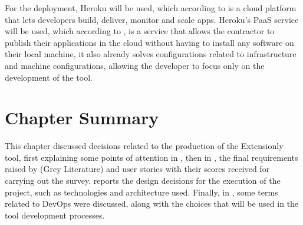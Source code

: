 For the deployment, Heroku will be used, which according to \textcite{heroku} is a cloud platform that lets developers build, deliver, monitor and scale apps. Heroku's \ac{PaaS} service will be used, which according to \textcite{Zvarevashe2014TheAO}, is a service that allows the contractor to publish their applications in the cloud without having to install any software on their local machine, it also already solves configurations related to infrastructure and machine configurations, allowing the developer to focus only on the development of the tool.

\section{Chapter Summary}

This chapter discussed decisions related to the production of the Extensionly tool, first explaining some points of attention in , then in , the final requirements raised by (Grey Literature) and user stories with their scores received for carrying out the survey.  reports the design decisions for the execution of the project, such as technologies and architecture used. Finally, in , some terms related to DevOps were discussed, along with the choices that will be used in the tool development processes.




